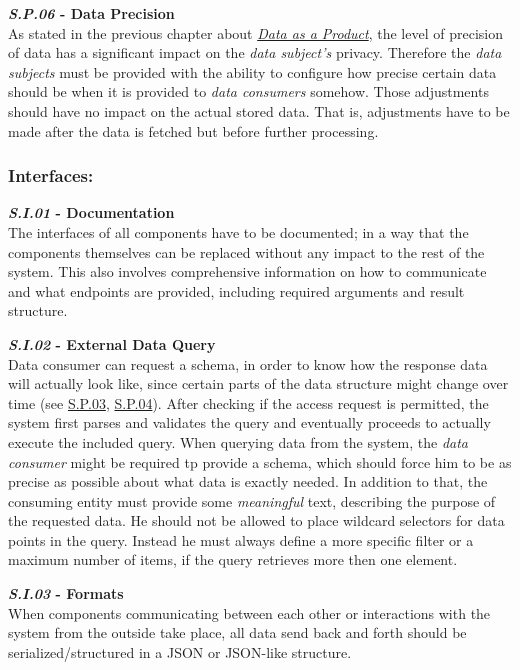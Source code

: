\documentclass[12pt,english,a4paper,titlepage,cleardoublepage=empty,dottedtoc]{report}
\begin{document}
\textbf{\emph{\protect\hypertarget{sp06}{}{S.P.06}} - Data Precision}\\
As stated in the previous chapter about
\emph{\protect\hyperlink{personal-data-as-a-product}{Data as a
Product}}, the level of precision of data has a significant impact on
the \emph{data subject's} privacy. Therefore the \emph{data subjects}
must be provided with the ability to configure how precise certain data
should be when it is provided to \emph{data consumers} somehow. Those
adjustments should have no impact on the actual stored data. That is,
adjustments have to be made after the data is fetched but before further
processing.

\subsubsection{Interfaces:}\label{interfaces}

\textbf{\emph{\protect\hypertarget{si01}{}{S.I.01}} - Documentation}\\
The interfaces of all components have to be documented; in a way that
the components themselves can be replaced without any impact to the rest
of the system. This also involves comprehensive information on how to
communicate and what endpoints are provided, including required
arguments and result structure.

\textbf{\emph{\protect\hypertarget{si02}{}{S.I.02}} - External Data
Query}\\
Data consumer can request a schema, in order to know how the response
data will actually look like, since certain parts of the data structure
might change over time (see \protect\hyperlink{sp03}{S.P.03},
\protect\hyperlink{sp04}{S.P.04}). After checking if the access request
is permitted, the system first parses and validates the query and
eventually proceeds to actually execute the included query. When
querying data from the system, the \emph{data consumer} might be
required tp provide a schema, which should force him to be as precise as
possible about what data is exactly needed. In addition to that, the
consuming entity must provide some \emph{meaningful} text, describing
the purpose of the requested data. He should not be allowed to place
wildcard selectors for data points in the query. Instead he must always
define a more specific filter or a maximum number of items, if the query
retrieves more then one element.

\textbf{\emph{\protect\hypertarget{si03}{}{S.I.03}} - Formats}\\
When components communicating between each other or interactions with
the system from the outside take place, all data send back and forth
should be serialized/structured in a JSON or JSON-like structure.
\end{document}
